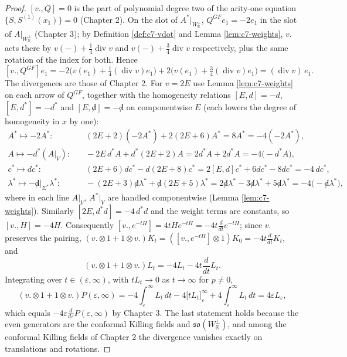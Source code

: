 \begin{proof}
$[v.,Q]=0$ is the part of polynomial degree two of the arity-one equation $\{S,S^{(1)}(x_1)\}=0$ (Chapter 2). On the slot of $A^*|_{W_{\mathbb R}^\perp}$, $Q^{GF}e_1=-2e_1$ in the slot of $A|_{W_{\mathbb R}^\perp}$ (Chapter 3); by Definition \ref{def:c7-vdot} and Lemma \ref{lem:c7-weights}, $v.$ acts there by $v(-)+\tfrac14\operatorname{div}v$ and $v(-)+\tfrac34\operatorname{div}v$ respectively, plus the same rotation of the index for both. Hence
\[
[v.,Q^{GF}]e_1=-2\big(v(e_1)+\tfrac14(\operatorname{div}v)e_1\big)+2\big(v(e_1)+\tfrac34(\operatorname{div}v)e_1\big)=(\operatorname{div}v)\,e_1 .
\]
The divergences are those of Chapter 2. For $v=2E$ use Lemma \ref{lem:c7-weights} on each arrow of $Q^{GF}$, together with the homogeneity relations $[E,d]=-d$, $[E,d^*]=-d^*$ and $[E,{\not d}]=-{\not d}$ on componentwise $E$ (each lowers the degree of homogeneity in $x$ by one):
\[
\begin{aligned}
A^*\mapsto-2A^*:&\quad (2E+2)(-2A^*)+2(2E+6)A^*=8A^*=-4(-2A^*),\\
A\mapsto-d^*(A|_V):&\quad -2E\,d^*A+d^*(2E+2)A=2d^*A+2d^*A=-4\big(-d^*A\big),\\
c^*\mapsto dc^*:&\quad (2E+6)dc^*-d(2E+8)c^*=2[E,d]c^*+6dc^*-8dc^*=-4\,dc^*,\\
\lambda^*\mapsto-{\not d}|_{\Sigma^*}\lambda^*:&\quad -(2E+3){\not d}\lambda^*+{\not d}(2E+5)\lambda^*=2{\not d}\lambda^*-3{\not d}\lambda^*+5{\not d}\lambda^*=-4\big(-{\not d}\lambda^*\big),
\end{aligned}
\]
where in each line $A|_V$, $A^*|_V$ are handled componentwise (Lemma \ref{lem:c7-weights}). Similarly $[2E,d^*d]=-4\,d^*d$ and the weight terms are constants, so $[v.,H]=-4H$. Consequently $[v.,e^{-tH}]=4tHe^{-tH}=-4t\frac{d}{dt}e^{-tH}$; since $v.$ preserves the pairing, $(v.\otimes1+1\otimes v.)K_t=([v.,e^{-tH}]\otimes1)K_0=-4t\frac{d}{dt}K_t$, and
\[
(v.\otimes1+1\otimes v.)L_t=-4L_t-4t\frac{d}{dt}L_t .
\]
Integrating over $t\in(\varepsilon,\infty)$, with $tL_t\to0$ as $t\to\infty$ for $p\neq0$,
\[
(v.\otimes1+1\otimes v.)P(\varepsilon,\infty)=-4\int_\varepsilon^\infty L_t\,dt-4\big[tL_t\big]_\varepsilon^\infty+4\int_\varepsilon^\infty L_t\,dt=4\varepsilon L_\varepsilon,
\]
which equals $-4\varepsilon\frac{d}{d\varepsilon}P(\varepsilon,\infty)$ by Chapter 3. The last statement holds because the even generators are the conformal Killing fields and $\mathfrak{so}(W_{\mathbb R}^\perp)$, and among the conformal Killing fields of Chapter 2 the divergence vanishes exactly on translations and rotations.
\end{proof}


